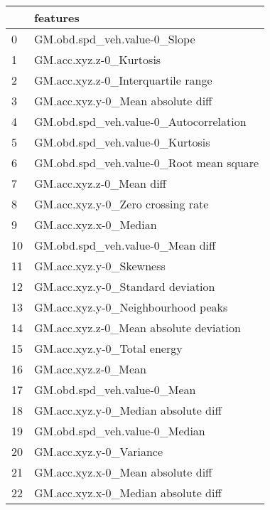 \begin{tabular}{ll}
\toprule
{} &                                 features \\
\midrule
0  &             GM.obd.spd\_veh.value-0\_Slope \\
1  &                  GM.acc.xyz.z-0\_Kurtosis \\
2  &       GM.acc.xyz.z-0\_Interquartile range \\
3  &        GM.acc.xyz.y-0\_Mean absolute diff \\
4  &   GM.obd.spd\_veh.value-0\_Autocorrelation \\
5  &          GM.obd.spd\_veh.value-0\_Kurtosis \\
6  &  GM.obd.spd\_veh.value-0\_Root mean square \\
7  &                 GM.acc.xyz.z-0\_Mean diff \\
8  &        GM.acc.xyz.y-0\_Zero crossing rate \\
9  &                    GM.acc.xyz.x-0\_Median \\
10 &         GM.obd.spd\_veh.value-0\_Mean diff \\
11 &                  GM.acc.xyz.y-0\_Skewness \\
12 &        GM.acc.xyz.y-0\_Standard deviation \\
13 &       GM.acc.xyz.y-0\_Neighbourhood peaks \\
14 &   GM.acc.xyz.z-0\_Mean absolute deviation \\
15 &              GM.acc.xyz.y-0\_Total energy \\
16 &                      GM.acc.xyz.z-0\_Mean \\
17 &              GM.obd.spd\_veh.value-0\_Mean \\
18 &      GM.acc.xyz.y-0\_Median absolute diff \\
19 &            GM.obd.spd\_veh.value-0\_Median \\
20 &                  GM.acc.xyz.y-0\_Variance \\
21 &        GM.acc.xyz.x-0\_Mean absolute diff \\
22 &      GM.acc.xyz.x-0\_Median absolute diff \\
\bottomrule
\end{tabular}
